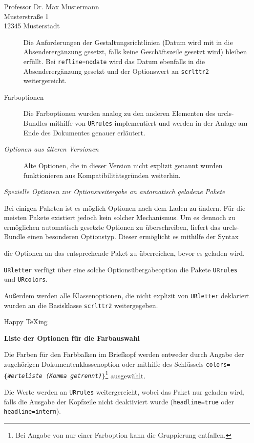 \documentclass[ngerman,parskip=half,colors={faculties,rz},headline=color]{URletter}
\newcommand*\pck[1]{\texttt{#1}}
\newcommand*\code[1]{\texttt{#1}}
\newcommand*\repl[1]{\textnormal{\textit{#1}}}
\newcommand*\cmd[1]{\par\vspace{-\parskip}\medskip\noindent\fbox{\ttfamily#1}\par\vspace{-\parskip}\medskip}
\newcommand*\heading[1]{\par\bigskip\emph{#1}\par\nobreak}
\begin{document}
\begin{letter}{Professor Dr. Max Mustermann\\Musterstraße 1\\12345 Musterstadt}
\begin{description}
	Die Anforderungen der Gestaltungsrichtlinien (Datum wird mit in die Absenderergänzung gesetzt, falls keine Geschäftszeile gesetzt wird) bleiben erfüllt. Bei \code{refline=nodate} wird das Datum ebenfalls in die Absenderergänzung gesetzt und der Optionswert an \pck{scrlttr2} weitergereicht.
	\item[Farboptionen] Die Farboptionen wurden analog zu den anderen Elementen des urcls-Bundles mithilfe von \pck{URrules} implementiert und werden in der Anlage am Ende des Dokumentes genauer erläutert.
	\item[\sffamily\itshape\mdseries Optionen aus älteren Versionen] Alte Optionen, die in dieser Version nicht explizit genannt wurden funktionieren aus Kompatibilitätsgründen weiterhin.
\end{description}

\heading{Spezielle Optionen zur Optionsweitergabe an automatisch geladene Pakete}

Bei einigen Paketen ist es möglich Optionen nach dem Laden zu ändern. Für die meisten Pakete existiert jedoch kein solcher Mechanismus. Um es dennoch zu ermöglichen automatisch gesetzte Optionen zu überschreiben, liefert das urcls-Bundle einen besonderen Optionstyp. Dieser ermöglicht es mithilfe der Syntax
\cmd{\repl{Paketname}=\{\repl{Option1},\repl{Option2}\}}
die Optionen an das entsprechende Paket zu überreichen, bevor es geladen wird.

\pck{URletter} verfügt über eine solche Optionsübergabeoption die Pakete \pck{URrules} und \pck{URcolors}.

Außerdem werden alle Klassenoptionen, die nicht explizit von \pck{URletter} deklariert wurden an die Basisklasse \pck{scrlttr2} weitergegeben.



\closing{Happy \TeX{}ing}


\end{letter}


\pagestyle{empty}
\textbf{\LARGE Liste der Optionen für die Farbauswahl}

\vspace{\baselineskip}
Die Farben für den Farbbalken im Briefkopf werden entweder durch Angabe der zugehörigen Dokumentenklassenoption oder mithilfe des Schlüssels \code{colors=\{\repl{Werteliste (Komma getrennt)}\}}\footnote{Bei Angabe von nur einer Farboption kann die Gruppierung entfallen.} ausgewählt.

Die Werte werden an \pck{URrules} weitergereicht, wobei das Paket nur geladen wird, falls die Ausgabe der Kopfzeile nicht deaktiviert wurde (\code{headline=true} oder \code{headline=intern}).
\end{document}
